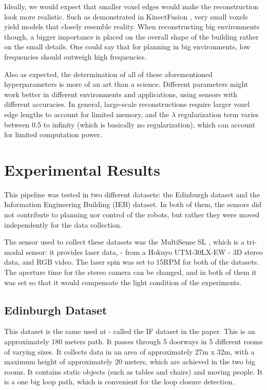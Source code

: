 \documentclass[11pt]{article}
\begin{document}
Ideally, we would expect that smaller voxel edges would make the reconstruction look more realistic. Such as demonstrated in KinectFusion \cite{kinectfusion}, very small voxels yield models that closely resemble reality. When reconstructing big environments though, a bigger importance is placed on the overall shape of the building rather on the small details. One could say that for planning in big environments, low frequencies should outweigh high frequencies. 

Also as expected, the determination of all of these aforementioned hyperparameters is more of an art than a science. Different parameters might work better in different environments and applications, using sensors with different accuracies. In general, large-scale reconstructions require larger voxel edge lengths to account for limited memory, and the $\lambda$ regularization term varies between 0.5 to infinity (which is basically no regularization), which can account for limited computation power.
			
	\newpage
	\section{Experimental Results}
	\label{subs:experiments}

This pipeline was tested in two different datasets: the Edinburgh dataset and the Information Engineering Building (IEB) dataset. In both of them, the sensors did not contribute to planning nor control of the robots, but rather they were moved independently for the data collection.
	
The sensor used to collect these datasets was the MultiSense SL \cite{multisense}, which is a tri-modal sensor: it provides laser data, - from a Hokuyo UTM-30LX-EW - 3D stereo data, and RGB video. The laser spin was set to 15RPM for both of the datasets. The aperture time for the stereo camera can be changed, and in both of them it was set so that it would compensate the light condition of the experiments. 
	
	\subsection{Edinburgh Dataset}

This dataset is the same used at \cite{AICPAlign} - called the IF dataset in the paper. This is an approximately 180 meters path. It passes through 5 doorways in 5 different rooms of varying sizes. It collects data in an area of approximately 27m x 32m, with a maximum height of approximately 20 meters, which are achieved in the two big rooms. It contains static objects (such as tables and chairs) and moving people. It is a one big loop path, which is convenient for the loop closure detection.
	
\end{document}
